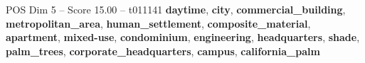 \begin{textsample}{POS Dim 5 – Score 15.00 – t011141}  \label{ex:f5_pos_032}
\textbf{daytime}, \textbf{city}, \textbf{commercial\_building}, \textbf{metropolitan\_area}, \textbf{human\_settlement}, \textbf{composite\_material}, \textbf{apartment}, \textbf{mixed-use}, \textbf{condominium}, \textbf{engineering}, \textbf{headquarters}, \textbf{shade}, \textbf{palm\_trees}, \textbf{corporate\_headquarters}, \textbf{campus}, \textbf{california\_palm}

\end{textsample}
